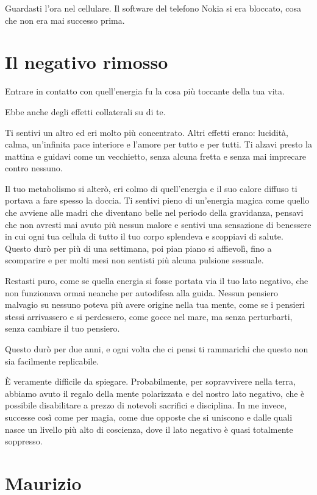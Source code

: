 Guardasti l'ora nel cellulare. Il software del telefono Nokia si era bloccato, cosa che non era mai successo prima.

\section{Il negativo rimosso}
\label{il_negativo_rimosso}

Entrare in contatto con quell'energia fu la cosa più toccante della tua vita.

Ebbe anche degli effetti collaterali su di te.

Ti sentivi un altro ed eri molto più concentrato. Altri effetti erano: lucidità, calma, un'infinita pace interiore e l'amore per tutto e per tutti. Ti alzavi presto la mattina e guidavi come un vecchietto, senza alcuna fretta e senza mai imprecare contro nessuno.

Il tuo metabolismo si alterò, eri colmo di quell'energia e il suo calore diffuso ti portava a fare spesso la doccia. Ti sentivi pieno di un'energia magica come quello che avviene alle madri che diventano belle nel periodo della gravidanza, pensavi che non avresti mai avuto più nessun malore e sentivi una sensazione di benessere in cui ogni tua cellula di tutto il tuo corpo splendeva e scoppiavi di salute. Questo durò per più di una settimana, poi pian piano si affievolì, fino a scomparire e per molti mesi non sentisti più alcuna pulsione sessuale.

Restasti puro, come se quella energia si fosse portata via il tuo lato negativo, che non funzionava ormai neanche per autodifesa alla guida. Nessun pensiero malvagio su nessuno poteva più avere origine nella tua mente, come se i pensieri stessi arrivassero e si perdessero, come gocce nel mare, ma senza perturbarti, senza cambiare il tuo pensiero.

Questo durò per due anni, e ogni volta che ci pensi ti rammarichi che questo non sia facilmente replicabile.

È veramente difficile da spiegare. Probabilmente, per sopravvivere nella terra, abbiamo avuto il regalo della mente polarizzata e del nostro lato negativo, che è possibile disabilitare a prezzo di notevoli sacrifici e disciplina. In me invece, successe così come per magia, come due opposte che si uniscono e dalle quali nasce un livello più alto di coscienza, dove il lato negativo è quasi totalmente soppresso.

\section{Maurizio}
\label{maurizio}

